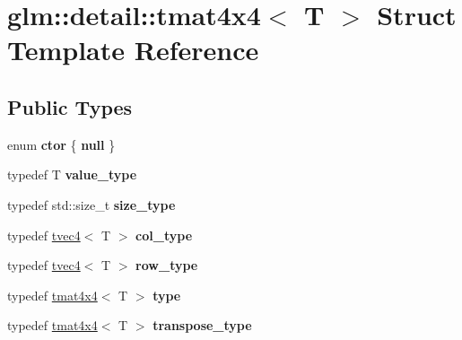 \hypertarget{structglm_1_1detail_1_1tmat4x4}{}\section{glm\+:\+:detail\+:\+:tmat4x4$<$ T $>$ Struct Template Reference}
\label{structglm_1_1detail_1_1tmat4x4}
\subsection*{Public Types}
\begin{DoxyCompactItemize}
\item 
\hypertarget{structglm_1_1detail_1_1tmat4x4_a314ae2df1758ddf97e2b024c32649cef}{}enum {\bfseries ctor} \{ {\bfseries null}
 \}\label{structglm_1_1detail_1_1tmat4x4_a314ae2df1758ddf97e2b024c32649cef}

\item 
\hypertarget{structglm_1_1detail_1_1tmat4x4_a1cecf5e761361c7059e46b24e29cd2f1}{}typedef T {\bfseries value\+\_\+type}\label{structglm_1_1detail_1_1tmat4x4_a1cecf5e761361c7059e46b24e29cd2f1}

\item 
\hypertarget{structglm_1_1detail_1_1tmat4x4_a8f1b0a2fa96bf7e719f7e2c11c656dd1}{}typedef std\+::size\+\_\+t {\bfseries size\+\_\+type}\label{structglm_1_1detail_1_1tmat4x4_a8f1b0a2fa96bf7e719f7e2c11c656dd1}

\item 
\hypertarget{structglm_1_1detail_1_1tmat4x4_a5dc30f4b00010b33f6b95e6c558dff68}{}typedef \hyperlink{structglm_1_1detail_1_1tvec4}{tvec4}$<$ T $>$ {\bfseries col\+\_\+type}\label{structglm_1_1detail_1_1tmat4x4_a5dc30f4b00010b33f6b95e6c558dff68}

\item 
\hypertarget{structglm_1_1detail_1_1tmat4x4_a9c0a194b62da2323d9a79bb40b4337f1}{}typedef \hyperlink{structglm_1_1detail_1_1tvec4}{tvec4}$<$ T $>$ {\bfseries row\+\_\+type}\label{structglm_1_1detail_1_1tmat4x4_a9c0a194b62da2323d9a79bb40b4337f1}

\item 
\hypertarget{structglm_1_1detail_1_1tmat4x4_ae20b8893d19f3dc56b587a2059d1769c}{}typedef \hyperlink{structglm_1_1detail_1_1tmat4x4}{tmat4x4}$<$ T $>$ {\bfseries type}\label{structglm_1_1detail_1_1tmat4x4_ae20b8893d19f3dc56b587a2059d1769c}

\item 
\hypertarget{structglm_1_1detail_1_1tmat4x4_a29c20e8f3f3ff49045950167027bfa0e}{}typedef \hyperlink{structglm_1_1detail_1_1tmat4x4}{tmat4x4}$<$ T $>$ {\bfseries transpose\+\_\+type}\label{structglm_1_1detail_1_1tmat4x4_a29c20e8f3f3ff49045950167027bfa0e}

\end{DoxyCompactItemize}
